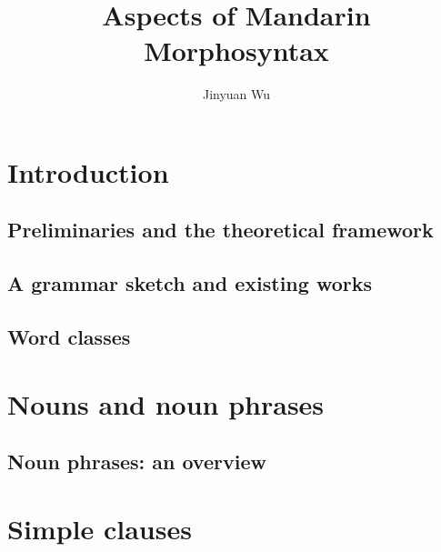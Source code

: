 \documentclass[UTF8, a4paper, oneside, scheme=plain]{ctexbook}
\title{Aspects of Mandarin Morphosyntax}
\author{Jinyuan Wu}
\numberwithin{equation}{chapter}
\numberwithin{equation}{chapter}
\begin{document}
\maketitle

\part{Introduction}

\chapter{Preliminaries and the theoretical framework}



\chapter{A grammar sketch and existing works}



\chapter{Word classes}



\part{Nouns and noun phrases}

\chapter{Noun phrases: an overview}



\part{Simple clauses}




\printindex
\end{document}
